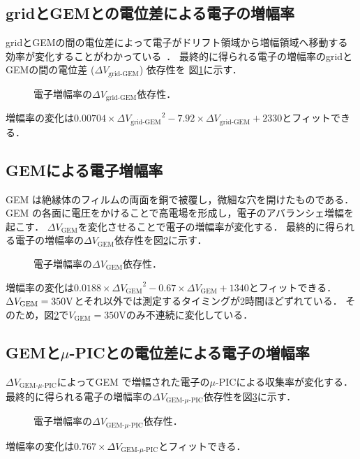 \documentclass[../master]{subfiles}
\begin{document}
\subsection{gridとGEMとの電位差による電子の増幅率}
gridとGEMの間の電位差によって電子がドリフト領域から増幅領域へ移動する効率が変化することがわかっている~\cite{furuno}．
最終的に得られる電子の増幅率のgridとGEMの間の電位差 ($\Delta V_{\text{grid-GEM}}$) 依存性を
図\ref{fig::gain_grid_GEM_V_dep}に示す．
\begin{figure}
  \centering
  \scalebox{0.7}{}
  \caption{電子増幅率の$\Delta V_{\text{grid-GEM}}$依存性．}
  \label{fig::gain_grid_GEM_V_dep}
\end{figure}
増幅率の変化は$0.00704\times{\Delta V_{\text{grid-GEM}}}^2-7.92\times{\Delta V_{\text{grid-GEM}}}+2330$とフィットできる．

\subsection{GEMによる電子増幅率}
GEM は絶縁体のフィルムの両面を銅で被覆し，微細な穴を開けたものである．
GEM の各面に電圧をかけることで高電場を形成し，電子のアバランシェ増幅を起こす．
$\Delta V_{\text{GEM}}$を変化させることで電子の増幅率が変化する．
最終的に得られる電子の増幅率の$\Delta V_{\text{GEM}}$依存性を図\ref{fig::gain_GEM_V_dep}に示す．
\begin{figure}
  \centering
  \scalebox{0.7}{}
  \caption{電子増幅率の$\Delta V_{\text{GEM}}$依存性．}
  \label{fig::gain_GEM_V_dep}
\end{figure}
増幅率の変化は$0.0188\times{\Delta V_{\text{GEM}}}^2-0.67\times{\Delta V_{\text{GEM}}}+1340$とフィットできる．
$\Delta V_{\rm GEM} = 350 {\rm V}$とそれ以外では測定するタイミングが2時間ほどずれている．
そのため，図\ref{fig::gain_GEM_V_dep}で$V_{\text{GEM}} = 350 {\text{V}}$のみ不連続に変化している．

\subsection{GEMと$\mu$-PICとの電位差による電子の増幅率}
$\Delta V_{\text{GEM-}\mu\text{-PIC}}$によってGEM で増幅された電子の$\mu$-PICによる収集率が変化する．
最終的に得られる電子の増幅率の$\Delta V_{\text{GEM-}\mu\text{-PIC}}$依存性を図\ref{fig::gain_GEM_uPIC_V_dep}に示す．
\begin{figure}
  \centering
  \scalebox{0.7}{}
  \caption{電子増幅率の$\Delta V_{\text{GEM-}\mu\text{-PIC}}$依存性．}
  \label{fig::gain_GEM_uPIC_V_dep}
\end{figure}
増幅率の変化は$0.767\times{\Delta V_{\text{GEM-}\mu\text{-PIC}}}$とフィットできる．
\end{document}
